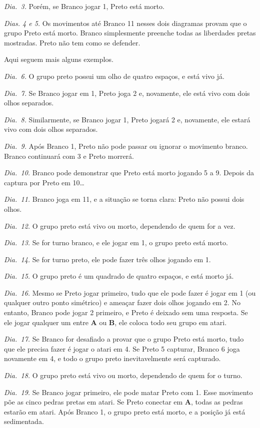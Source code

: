 \emph{Dia.\@~3.} Porém, se Branco jogar 1, Preto está morto.

\emph{Dias. 4 e 5.} Os movimentos até Branco 11 nesses dois diagramas provam que o grupo Preto está morto. Branco simplesmente preenche todas as liberdades pretas mostradas. Preto não tem como se defender.

Aqui seguem mais alguns exemplos.

\emph{Dia.\@~6.} O grupo preto possui um olho de quatro espaços, e está vivo já.

\emph{Dia.\@~7.} Se Branco jogar em 1, Preto joga 2 e, novamente, ele está vivo com dois olhos separados.

\emph{Dia.\@~8.} Similarmente, se Branco jogar 1, Preto jogará 2 e, novamente, ele estará vivo com dois olhos separados.

\emph{Dia.\@~9.} Após Branco 1, Preto não pode passar ou ignorar o movimento branco. Branco continuará com 3 e Preto morrerá.

\emph{Dia.\@~10.} Branco pode demonstrar que Preto está morto jogando 5 a 9. Depois da captura por Preto em 10\ldots

\emph{Dia.\@~11.} Branco joga em 11, e a situação se torna clara: Preto não possui dois olhos.

\emph{Dia.\@~12.} O grupo preto está vivo ou morto, dependendo de quem for a vez.

\emph{Dia.\@~13.} Se for turno branco, e ele jogar em 1, o grupo preto está morto.

\emph{Dia.\@~14.} Se for turno preto, ele pode fazer três olhos jogando em 1.

\emph{Dia.\@~15.} O grupo preto é um quadrado de quatro espaços, e está morto já.

\emph{Dia.\@~16.} Mesmo se Preto jogar primeiro, tudo que ele pode fazer é jogar em 1 (ou qualquer outro ponto simétrico) e ameaçar fazer dois olhos jogando em 2. No entanto, Branco pode jogar 2 primeiro, e Preto é deixado sem uma resposta. Se ele jogar qualquer um entre \textbf{A} ou \textbf{B}, ele coloca todo seu grupo em atari.

\emph{Dia.\@~17.} Se Branco for desafiado a provar que o grupo Preto está morto, tudo que ele precisa fazer é jogar o atari em 4. Se Preto 5 capturar, Branco 6 joga novamente em 4, e todo o grupo preto inevitavelmente será capturado.

\emph{Dia.\@~18.} O grupo preto está vivo ou morto, dependendo de quem for o turno.

\emph{Dia.\@~19.} Se Branco jogar primeiro, ele pode matar Preto com 1. Esse movimento põe as cinco pedras pretas em atari. Se Preto conectar em \textbf{A}, todas as pedras estarão em atari. Após Branco 1, o grupo preto está morto, e a posição já está sedimentada.

